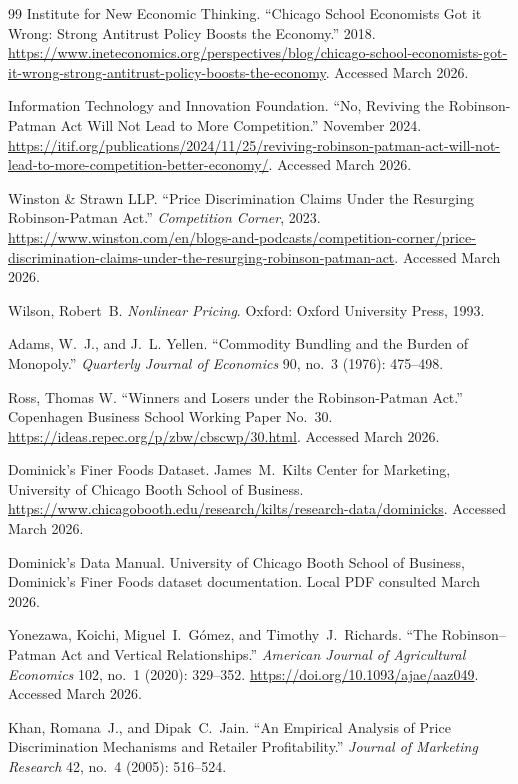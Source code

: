 \documentclass[12pt]{article}
\theoremstyle{definition}
\begin{document}
\begin{thebibliography}{99}
Institute for New Economic Thinking.
``Chicago School Economists Got it Wrong: Strong Antitrust Policy Boosts the Economy.''
2018.
\url{https://www.ineteconomics.org/perspectives/blog/chicago-school-economists-got-it-wrong-strong-antitrust-policy-boosts-the-economy}.
Accessed March 2026.

Information Technology and Innovation Foundation.
``No, Reviving the Robinson-Patman Act Will Not Lead to More Competition.''
November 2024.
\url{https://itif.org/publications/2024/11/25/reviving-robinson-patman-act-will-not-lead-to-more-competition-better-economy/}.
Accessed March 2026.

Winston \& Strawn LLP.
``Price Discrimination Claims Under the Resurging Robinson-Patman Act.''
\textit{Competition Corner}, 2023.
\url{https://www.winston.com/en/blogs-and-podcasts/competition-corner/price-discrimination-claims-under-the-resurging-robinson-patman-act}.
Accessed March 2026.

Wilson, Robert~B.
\textit{Nonlinear Pricing}.
Oxford: Oxford University Press, 1993.

Adams, W.~J., and J.~L. Yellen.
``Commodity Bundling and the Burden of Monopoly.''
\textit{Quarterly Journal of Economics} 90, no.~3 (1976): 475--498.

Ross, Thomas W.
``Winners and Losers under the Robinson-Patman Act.''
Copenhagen Business School Working Paper No.~30.
\url{https://ideas.repec.org/p/zbw/cbscwp/30.html}.
Accessed March 2026.

Dominick's Finer Foods Dataset.
James~M.\ Kilts Center for Marketing, University of Chicago Booth School of Business.
\url{https://www.chicagobooth.edu/research/kilts/research-data/dominicks}.
Accessed March 2026.

Dominick's Data Manual.
University of Chicago Booth School of Business, Dominick's Finer Foods dataset documentation.
Local PDF consulted March 2026.

Yonezawa, Koichi, Miguel~I.\ G\'{o}mez, and Timothy~J.\ Richards.
``The Robinson--Patman Act and Vertical Relationships.''
\textit{American Journal of Agricultural Economics} 102, no.~1 (2020): 329--352.
\url{https://doi.org/10.1093/ajae/aaz049}.
Accessed March 2026.

Khan, Romana~J., and Dipak~C.\ Jain.
``An Empirical Analysis of Price Discrimination Mechanisms and Retailer Profitability.''
\textit{Journal of Marketing Research} 42, no.~4 (2005): 516--524.

\end{thebibliography}
\end{document}
